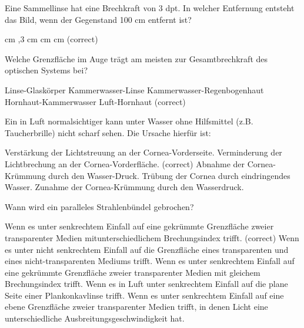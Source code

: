 \documentclass[11pt]{exam}
\begin{document}
\setlength{\voffset}{-0.5in}
\setlength{\headsep}{5pt}

\hspace{2mm}
 \hspace{5mm}
\vspace{4mm}

\begin{questions}

\question Eine Sammellinse hat eine Brechkraft von 3 dpt. In welcher Entfernung entsteht das Bild, wenn der Gegenstand 100 cm entfernt ist?

\begin{choices}
	 cm
	,3 cm
	 cm
	\choice 150cm
	 cm (correct)
\end{choices}

\vspace{3mm}\question Welche Grenzfläche im Auge trägt am meisten zur Gesamtbrechkraft des optischen Systems bei?

\begin{choices}
	\choice Linse-Glaskörper
	\choice Kammerwasser-Linse
	\choice Kammerwasser-Regenbogenhaut
	\choice Hornhaut-Kammerwasser
	\choice Luft-Hornhaut (correct)
\end{choices}

\vspace{3mm}\question Ein in Luft normalsichtiger kann unter Wasser ohne Hilfsmittel (z.B. Taucherbrille) nicht scharf sehen. Die Ursache hierfür ist:

\begin{choices}
	\choice Verstärkung der Lichtstreuung an der Cornea-Vorderseite.
	\choice Verminderung der Lichtbrechung an der Cornea-Vorderfläche. (correct)
	\choice Abnahme der Cornea-Krümmung durch den Wasser-Druck.
	\choice Trübung der Cornea durch eindringendes Wasser.
	\choice Zunahme der Cornea-Krümmung durch den Wasserdruck.
\end{choices}

\vspace{3mm}\question Wann wird ein paralleles Strahlenbündel gebrochen?

\begin{choices}
	\choice Wenn es unter senkrechtem Einfall auf eine gekrümmte Grenzfläche zweier transparenter Medien mitunterschiedlichem Brechungsindex trifft. (correct)
	\choice Wenn es unter nicht senkrechtem Einfall auf die Grenzfläche eines transparenten und eines nicht-transparenten Mediums trifft.
	\choice Wenn es unter senkrechtem Einfall auf eine gekrümmte Grenzfläche zweier transparenter Medien mit gleichem Brechungsindex trifft.
	\choice Wenn es in Luft unter senkrechtem Einfall auf die plane Seite einer Plankonkavlinse trifft.
	\choice Wenn es unter senkrechtem Einfall auf eine ebene Grenzfläche zweier transparenter Medien trifft, in denen Licht eine unterschiedliche Ausbreitungsgeschwindigkeit hat.
\end{choices}


\end{questions}
\end{document}
